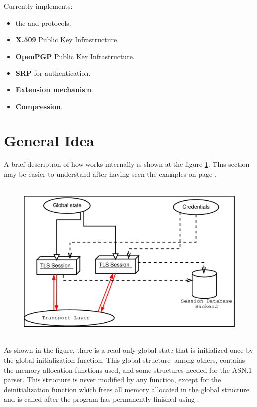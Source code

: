 Currently \gnutls{} implements:
\begin{itemize}
\item the \tlsI{} and \sslIII{} protocols.
\item {\bf X.509} Public Key Infrastructure.
\item {\bf OpenPGP} Public Key Infrastructure.
\item {\bf SRP} for \tls{} authentication.
\item \tls{} {\bf Extension mechanism}.
\item \tls{} {\bf Compression}.
\end{itemize}


\section{General Idea}
A brief description of how \gnutls{} works internally is shown at
the figure \ref{fig:internals}. This section may be easier to understand
after having seen the examples on page \pageref{examples}.

\begin{figure}[htp]
\includegraphics[height=8cm,width=12cm]{internals}
\label{fig:internals}
\end{figure}

\par
As shown in the figure, there is a read-only global state that
is initialized once by the global initialization function.
This global structure, among others, contains the memory allocation
functions used, and some structures needed for the ASN.1 parser.
This structure is never modified by any \gnutls{} function, except
for the deinitialization function which frees all memory allocated in
the global structure and is called after the program has permanently finished 
using \gnutls{}.

